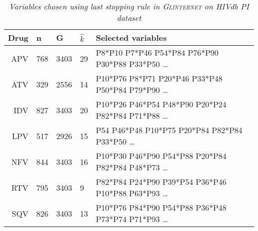 \begin{table}[ht]
\centering
\begin{tabular}{rllll}
  \hline
Drug & n & G & $\hat k$ & Selected variables \\ 
  \hline
APV & 768 & 3403 & 29 &P8*P10 P7*P46 P54*P84 P76*P90 P30*P88 P33*P50
\ldots \\
ATV & 329 & 2556 & 14&P10*P76 P8*P71 P20*P46 P33*P48 P50*P84 P79*P90 \ldots \\
IDV & 827 & 3403 & 20&P10*P26 P46*P54 P48*P90 P20*P24 P82*P84 P71*P88 \ldots \\
LPV & 517 & 2926 & 15&P54 P46*P48 P10*P75 P20*P84 P82*P84 P33*P50 \ldots \\
NFV & 844 & 3403 & 16&P10*P30 P46*P90 P54*P88 P20*P84 P82*P84 P48*P73 \ldots \\
RTV & 795 & 3403 & 9&P82*P84 P24*P90 P39*P54 P36*P46 P10*P88 P63*P93 \ldots \\
SQV & 826 & 3403 & 13&P10*P76 P84*P90 P54*P88 P36*P48 P73*P74 P71*P93 \ldots \\
   \hline
\end{tabular}
\caption{\em Variables chosen using \textit{last} stopping rule in
  \textsc{Glinternet} on HIVdb PI dataset} 
\label{tab:glintPI}
\end{table}

